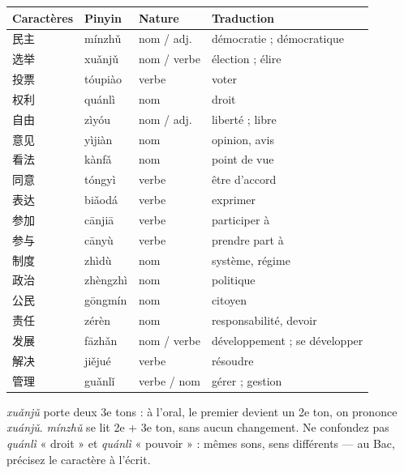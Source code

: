 \documentclass[11pt]{article}
\newcommand{\zh}[1]{\ifmmode\text{#1}\else{#1}\fi}
\begin{document}
\begin{center}
\begin{tabularx}{\linewidth}{|X|X|X|X|}
\hline
\rowcolor{popblueL} Caractères & Pinyin & Nature & Traduction \\
\hline
民主 & mínzhǔ & nom / adj. & démocratie ; démocratique \\
\hline
选举 & xuǎnjǔ & nom / verbe & élection ; élire \\
\hline
投票 & tóupiào & verbe & voter \\
\hline
权利 & quánlì & nom & droit \\
\hline
自由 & zìyóu & nom / adj. & liberté ; libre \\
\hline
意见 & yìjiàn & nom & opinion, avis \\
\hline
看法 & kànfǎ & nom & point de vue \\
\hline
同意 & tóngyì & verbe & être d'accord \\
\hline
表达 & biǎodá & verbe & exprimer \\
\hline
参加 & cānjiā & verbe & participer à \\
\hline
参与 & cānyù & verbe & prendre part à \\
\hline
制度 & zhìdù & nom & système, régime \\
\hline
政治 & zhèngzhì & nom & politique \\
\hline
公民 & gōngmín & nom & citoyen \\
\hline
责任 & zérèn & nom & responsabilité, devoir \\
\hline
发展 & fāzhǎn & nom / verbe & développement ; se développer \\
\hline
解决 & jiějué & verbe & résoudre \\
\hline
管理 & guǎnlǐ & verbe / nom & gérer ; gestion \\
\hline
\end{tabularx}
\end{center}

\begin{attention}
\zh{选举} \emph{xuǎnjǔ} porte deux 3e tons : à l'oral, le premier devient un 2e ton, on prononce \emph{xuánjǔ}. \zh{民主} \emph{mínzhǔ} se lit 2e + 3e ton, sans aucun changement. Ne confondez pas \zh{权利} \emph{quánlì} « droit » et \zh{权力} \emph{quánlì} « pouvoir » : mêmes sons, sens différents — au Bac, précisez le caractère à l'écrit.
\end{attention}
\end{document}
